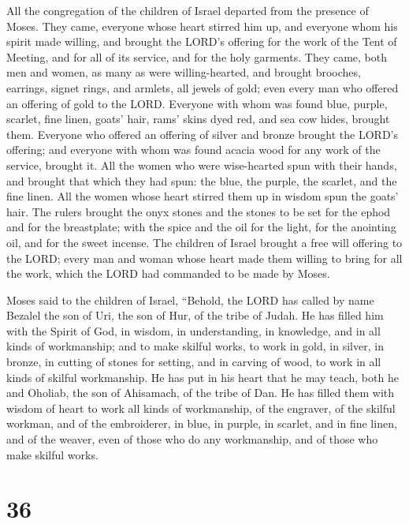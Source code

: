  All the congregation of the children of Israel departed
from the presence of Moses.  They came, everyone whose
heart stirred him up, and everyone whom his spirit made willing, and
brought the LORD's offering for the work of the Tent of Meeting, and for
all of its service, and for the holy garments.  They
came, both men and women, as many as were willing-hearted, and brought
brooches, earrings, signet rings, and armlets, all jewels of gold; even
every man who offered an offering of gold to the LORD. 
Everyone with whom was found blue, purple, scarlet, fine linen, goats'
hair, rams' skins dyed red, and sea cow hides, brought them.
 Everyone who offered an offering of silver and bronze
brought the LORD's offering; and everyone with whom was found acacia
wood for any work of the service, brought it.  All the
women who were wise-hearted spun with their hands, and brought that
which they had spun: the blue, the purple, the scarlet, and the fine
linen.  All the women whose heart stirred them up in
wisdom spun the goats' hair.  The rulers brought the onyx
stones and the stones to be set for the ephod and for the breastplate;
 with the spice and the oil for the light, for the
anointing oil, and for the sweet incense.  The children
of Israel brought a free will offering to the LORD; every man and woman
whose heart made them willing to bring for all the work, which the LORD
had commanded to be made by Moses.

 Moses said to the children of Israel, ``Behold, the LORD
has called by name Bezalel the son of Uri, the son of Hur, of the tribe
of Judah.  He has filled him with the Spirit of God, in
wisdom, in understanding, in knowledge, and in all kinds of workmanship;
 and to make skilful works, to work in gold, in silver,
in bronze,  in cutting of stones for setting, and in
carving of wood, to work in all kinds of skilful workmanship.
 He has put in his heart that he may teach, both he and
Oholiab, the son of Ahisamach, of the tribe of Dan.  He
has filled them with wisdom of heart to work all kinds of workmanship,
of the engraver, of the skilful workman, and of the embroiderer, in
blue, in purple, in scarlet, and in fine linen, and of the weaver, even
of those who do any workmanship, and of those who make skilful works.

\hypertarget{section-35}{%
\section{36}\label{section-35}}

